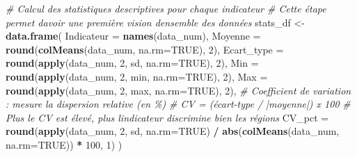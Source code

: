 \documentclass[
]{article}
\newenvironment{Shaded}{\begin{snugshade}}{\end{snugshade}}
\newcommand{\AttributeTok}[1]{\textcolor[rgb]{0.13,0.29,0.53}{#1}}
\newcommand{\CommentTok}[1]{\textcolor[rgb]{0.56,0.35,0.01}{\textit{#1}}}
\newcommand{\ConstantTok}[1]{\textcolor[rgb]{0.56,0.35,0.01}{#1}}
\newcommand{\DecValTok}[1]{\textcolor[rgb]{0.00,0.00,0.81}{#1}}
\newcommand{\FunctionTok}[1]{\textcolor[rgb]{0.13,0.29,0.53}{\textbf{#1}}}
\newcommand{\NormalTok}[1]{#1}
\newcommand{\OtherTok}[1]{\textcolor[rgb]{0.56,0.35,0.01}{#1}}
\newcommand{\SpecialCharTok}[1]{\textcolor[rgb]{0.81,0.36,0.00}{\textbf{#1}}}
\begin{document}
\begin{Shaded}
\begin{Highlighting}[]
\CommentTok{\# Calcul des statistiques descriptives pour chaque indicateur}
\CommentTok{\# Cette étape permet d\textquotesingle{}avoir une première vision d\textquotesingle{}ensemble des données}
\NormalTok{stats\_df }\OtherTok{\textless{}{-}} \FunctionTok{data.frame}\NormalTok{(}
  \AttributeTok{Indicateur =} \FunctionTok{names}\NormalTok{(data\_num),}
  \AttributeTok{Moyenne    =} \FunctionTok{round}\NormalTok{(}\FunctionTok{colMeans}\NormalTok{(data\_num, }\AttributeTok{na.rm=}\ConstantTok{TRUE}\NormalTok{), }\DecValTok{2}\NormalTok{),}
  \AttributeTok{Ecart\_type =} \FunctionTok{round}\NormalTok{(}\FunctionTok{apply}\NormalTok{(data\_num, }\DecValTok{2}\NormalTok{, sd, }\AttributeTok{na.rm=}\ConstantTok{TRUE}\NormalTok{), }\DecValTok{2}\NormalTok{),}
  \AttributeTok{Min        =} \FunctionTok{round}\NormalTok{(}\FunctionTok{apply}\NormalTok{(data\_num, }\DecValTok{2}\NormalTok{, min, }\AttributeTok{na.rm=}\ConstantTok{TRUE}\NormalTok{), }\DecValTok{2}\NormalTok{),}
  \AttributeTok{Max        =} \FunctionTok{round}\NormalTok{(}\FunctionTok{apply}\NormalTok{(data\_num, }\DecValTok{2}\NormalTok{, max, }\AttributeTok{na.rm=}\ConstantTok{TRUE}\NormalTok{), }\DecValTok{2}\NormalTok{),}
  \CommentTok{\# Coefficient de variation : mesure la dispersion relative (en \%)}
  \CommentTok{\# CV = (écart{-}type / |moyenne|) x 100}
  \CommentTok{\# Plus le CV est élevé, plus l\textquotesingle{}indicateur discrimine bien les régions}
  \AttributeTok{CV\_pct     =} \FunctionTok{round}\NormalTok{(}\FunctionTok{apply}\NormalTok{(data\_num, }\DecValTok{2}\NormalTok{, sd, }\AttributeTok{na.rm=}\ConstantTok{TRUE}\NormalTok{) }\SpecialCharTok{/}
                     \FunctionTok{abs}\NormalTok{(}\FunctionTok{colMeans}\NormalTok{(data\_num, }\AttributeTok{na.rm=}\ConstantTok{TRUE}\NormalTok{)) }\SpecialCharTok{*} \DecValTok{100}\NormalTok{, }\DecValTok{1}\NormalTok{)}
\NormalTok{)}


\end{Highlighting}
\end{Shaded}
\end{document}

